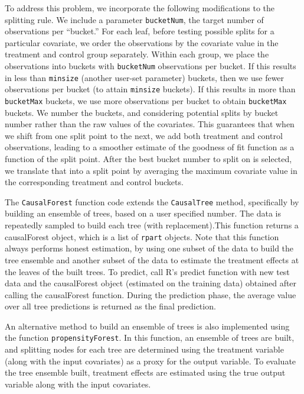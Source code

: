\documentclass[11pt]{article}
\begin{document}
To address this problem, we incorporate the following modifications to the splitting rule.  We include a parameter \texttt{bucketNum},
the target number of observations per ``bucket.'' For each leaf, before testing possible
splits for a particular covariate, we order the observations by the covariate value in the treatment and control group separately.  Within each group, we place the observations into buckets with \texttt{bucketNum} observations per bucket.  If this results in less than \texttt{minsize} (another user-set parameter) buckets, then we use fewer observations
per bucket (to attain \texttt{minsize} buckets). If this results in more than \texttt{bucketMax} buckets, we use more observations per bucket to obtain \texttt{bucketMax} buckets.
We number the buckets, and considering potential splits by bucket number rather than the raw
values of the covariates.  This guarantees that when we shift from one split point to the next, we add both treatment and
control observations, leading to a smoother estimate of the goodness of fit function as a function of the split point.  After the
best bucket number to split on is selected, we translate that into a split point by averaging the maximum covariate value in
the corresponding treatment and control buckets.\par

The \texttt{CausalForest} function code extends the \texttt{CausalTree} method, specifically by building an ensemble of trees, based on a user specified number. The data is repeatedly sampled to build each tree (with replacement).This function returns a causalForest object, which is a list of \texttt{rpart} objects. Note that this function always performs honest estimation, by using one subset of the data to build the tree ensemble and another subset of the data to estimate the treatment effects at the leaves of the built trees. To predict, call R's predict function with new test data and the causalForest object (estimated on the training data) obtained after calling the causalForest function. During the prediction phase, the average value over all tree predictions is returned as the final prediction.

An alternative method to build an ensemble of trees is also implemented using the function \texttt{propensityForest}.
In this function, an ensemble of trees are built, and splitting nodes for each tree are determined using the treatment variable (along with the input covariates) as a proxy for the output variable. To evaluate the tree ensemble built, treatment effects are estimated using the true output variable along with the input covariates.
\end{document}
